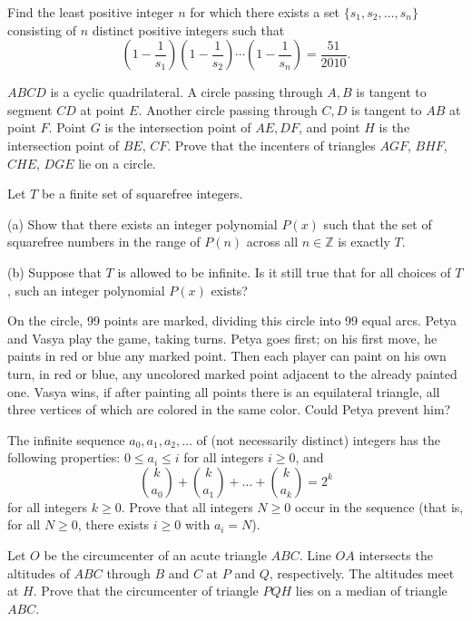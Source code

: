 \documentclass[11pt]{scrartcl}
\begin{document}
\begin{problem}[2008341270346760748]
Find the least positive integer $n$ for which there exists a set $\{s_1, s_2, \ldots , s_n\}$ consisting of $n$ distinct positive integers such that
\[ \left( 1 - \frac{1}{s_1} \right) \left( 1 - \frac{1}{s_2} \right) \cdots \left( 1 - \frac{1}{s_n} \right) = \frac{51}{2010}.\]
\end{problem}
\begin{problem}[2040194717643782420]
	$ABCD$ is a cyclic quadrilateral. A circle passing through $A,B$ is tangent to segment $CD$ at point $E$. Another circle passing through $C,D$ is tangent to $AB$ at point $F$. Point $G$ is the intersection point of $AE,DF$, and point $H$ is the intersection point of $BE$, $CF$. Prove that the incenters of triangles $AGF$, $BHF$, $CHE$, $DGE$ lie on a circle.
\end{problem}
\begin{problem}[2100441935415071480]
Let $T$ be a finite set of squarefree integers.

(a) Show that there exists an integer polynomial $P(x)$ such that the set of squarefree numbers in the range of $P(n)$ across all $n \in \mathbb{Z}$ is exactly $T$.

(b) Suppose that $T$ is allowed to be infinite. Is it still true that for all choices of $T$, such an integer polynomial $P(x)$ exists?
\end{problem}
\begin{problem}[2117883853443241027]
On the circle, 99 points are marked, dividing this circle into 99 equal arcs. Petya and Vasya play the game, taking turns. Petya goes first; on his first move, he paints in red or blue any marked point. Then each player can paint on his own turn, in red or blue, any uncolored marked point adjacent to the already painted one. Vasya wins, if after painting all points there is an equilateral triangle, all three vertices of which are colored in the same color. Could Petya prevent him?
\end{problem}
\begin{problem}[2134021625648303394]
The infinite sequence $a_0,a _1, a_2, \dots$ of (not necessarily distinct) integers has the following properties: $0\le a_i \le i$ for all integers $i\ge 0$, and\[\binom{k}{a_0} + \binom{k}{a_1} + \dots + \binom{k}{a_k} = 2^k\]for all integers $k\ge 0$. Prove that all integers $N\ge 0$ occur in the sequence (that is, for all $N\ge 0$, there exists $i\ge 0$ with $a_i=N$).
\end{problem}
\begin{problem}[2139114147569608698]
Let $O$ be the circumcenter of an acute triangle $ABC$. Line $OA$ intersects the altitudes of $ABC$ through $B$ and $C$ at $P$ and $Q$, respectively. The altitudes meet at $H$. Prove that the circumcenter of triangle $PQH$ lies on a median of triangle $ABC$.
\end{problem}
\end{document}
